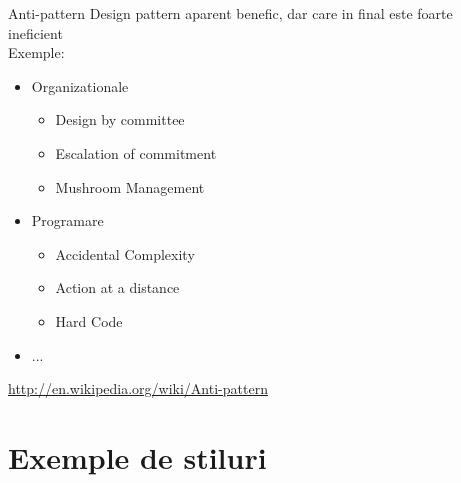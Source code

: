 \documentclass{beamer}
\begin{document}
  \begin{frame}{Anti-pattern}
  Design pattern aparent benefic, dar care in final este foarte ineficient
  \pause \\\vspace{0.3cm}Exemple:\vspace{0.3cm}
  \begin{itemize}
  \item Organizationale \begin{itemize} \item Design by committee \item Escalation of commitment \item Mushroom Management \end{itemize}
  \item Programare \begin{itemize} \item Accidental Complexity \item Action at a distance \item Hard Code \end{itemize}
  \item ...
  \end{itemize}
  \url{http://en.wikipedia.org/wiki/Anti-pattern}
  \end{frame} 


\section{Exemple de stiluri}

  \frame{\tableofcontents[currentsection]}
\end{document}
